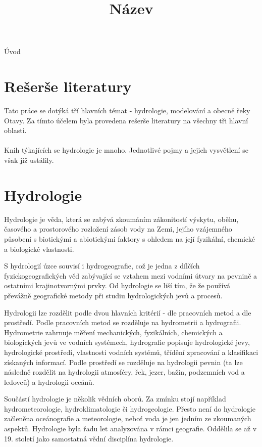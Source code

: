 \documentclass[thesis=M,czech]{FITthesis}[2012/06/26]
\title{Název}
\begin{document}

\begin{introduction}
Úvod


\end{introduction}

\chapter{Rešerše literatury}
Tato práce se dotýká tří hlavních témat - hydrologie, modelování a obecně řeky Otavy. Za tímto účelem byla provedena rešerše literatury na všechny tři hlavní oblasti. \\
\\
Knih týkajících se hydrologie je mnoho. Jednotlivé pojmy a jejich vysvětlení se však již ustálily. 


\chapter{Hydrologie}

Hydrologie je věda, která se zabývá zkoumáním zákonitostí výskytu, oběhu, časového a prostorového rozložení zásob vody na Zemi, jejího vzájemného působení s biotickými a abiotickými faktory s ohledem na její fyzikální, chemické a biologické vlastnosti. \cite{definiceHydro} 


S hydrologií úzce souvisí i hydrogeografie, což je jedna z dílčích fyzickogeografických věd zabývající se vztahem mezi vodními útvary na pevnině a ostatními krajinotvornými prvky. Od hydrologie se liší tím, že že používá převážně geografické metody při studiu hydrologických jevů a procesů. \cite{FGkniha}


Hydrologii lze rozdělit podle dvou hlavních kritérií - dle pracovních metod a dle prostředí. Podle pracovních metod se rozděluje na hydrometrii a hydrografii. Hydrometrie zahrnuje měření mechanických, fyzikálních, chemických a biologických jevů ve vodních systémech, hydrografie popisuje hydrologické jevy, hydrologické prostředí, vlastnosti vodních systémů, třídění zpracování a klasifikaci získaných informací. Podle prostředí se rozděluje na hydrologii pevnin (ta lze následně rozdělit na hydrologii atmosféry, řek, jezer, bažin, podzemních vod a ledovců) a hydrologii oceánů. \cite{hydro_net}

Součástí hydrologie je několik vědních oborů. Za zmínku stojí například hydrometeorologie, hydroklimatologie či hydrogeologie. Přesto není do hydrologie začleněna oceánografie a meteorologie, neboť voda je jen jedním ze zkoumaných aspektů. Hydrologie byla řadu let analyzována v rámci geografie. Oddělila se až v 19. století jako samostatná vědní disciplína hydrologie. 
\end{document}
